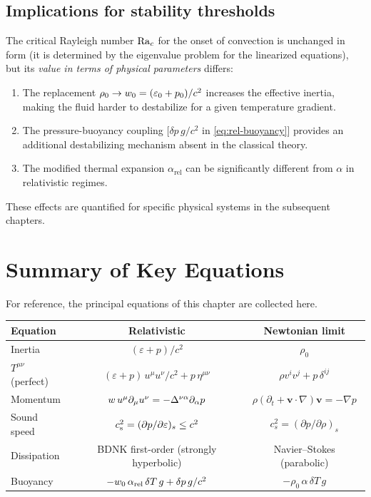 \subsection{Implications for stability thresholds}
\label{sec:bouss-implications}

The critical Rayleigh number $\mathrm{Ra}_c$ for the onset of convection is
unchanged in form (it is determined by the eigenvalue problem for
the linearized equations), but its \emph{value in terms of physical
parameters} differs:
\begin{enumerate}
\item The replacement $\rho_0 \to w_0 = (\varepsilon_0 + p_0)/c^2$
  increases the effective inertia, making the fluid harder to
  destabilize for a given temperature gradient.
\item The pressure-buoyancy coupling [$\delta p\, g/c^2$ in
  \eqref{eq:rel-buoyancy}] provides an additional destabilizing
  mechanism absent in the classical theory.
\item The modified thermal expansion $\alpha_{\mathrm{rel}}$ can be
  significantly different from $\alpha$ in relativistic regimes.
\end{enumerate}
These effects are quantified for specific physical systems in the
subsequent chapters.

\section{Summary of Key Equations}
\label{sec:summary-eqs}

For reference, the principal equations of this chapter are collected
here.

\begin{center}
\begin{tabular}{lcc}
\hline
\textbf{Equation} & \textbf{Relativistic} & \textbf{Newtonian limit} \\
\hline
Inertia & $(\varepsilon+p)/c^2$ & $\rho_0$ \\
$T^{\mu\nu}$ (perfect) &
  $(\varepsilon+p)\,u^{\mu}u^{\nu}/c^2 + p\,\eta^{\mu\nu}$ &
  $\rho v^i v^j + p\,\delta^{ij}$ \\
Momentum & $w\, u^{\mu}\partial_{\mu} u^{\nu}
  = -\Delta^{\nu\alpha}\partial_{\alpha}p$ &
  $\rho(\partial_t + \mathbf{v}\cdot\nabla)\mathbf{v} = -\nabla p$ \\
Sound speed & $c_{\mathrm{s}}^2 = (\partial p/\partial\varepsilon)_s \le c^2$ &
  $c_s^2 = (\partial p/\partial\rho)_s$ \\
Dissipation & BDNK first-order (strongly hyperbolic) & Navier--Stokes (parabolic) \\
Buoyancy & $-w_0\,\alpha_{\mathrm{rel}}\,\delta T\, g
  + \delta p\, g/c^2$ &
  $-\rho_0\,\alpha\,\delta T\, g$ \\
\hline
\end{tabular}
\end{center}

